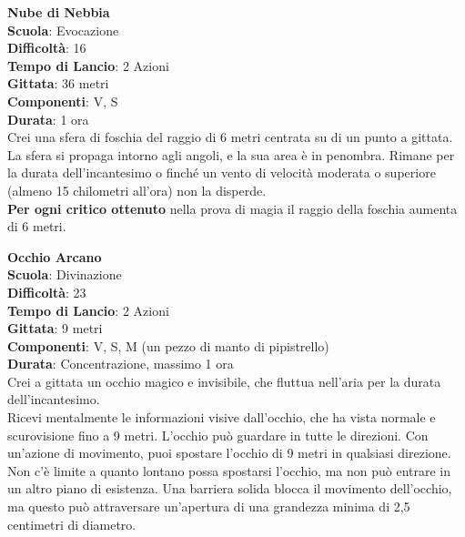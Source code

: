 \begin{multicols}{2}
\medskip\textbf{Nube di Nebbia}\\
\textbf{Scuola}: Evocazione\\
\textbf{Difficoltà}: 16\\
\textbf{Tempo di Lancio}: 2 Azioni\\
\textbf{Gittata}: 36 metri\\
\textbf{Componenti}: V, S\\
\textbf{Durata}: 1 ora\\
Crei una sfera di foschia del raggio di 6 metri centrata su di un punto a gittata. La sfera si propaga intorno agli angoli, e la sua area è in penombra. Rimane per la durata dell'incantesimo o finché un vento di velocità moderata o superiore (almeno 15 chilometri all'ora) non la disperde.\\
\textbf{Per ogni critico ottenuto} nella prova di magia il raggio della foschia aumenta di 6 metri.

\medskip\textbf{Occhio Arcano}\\
\textbf{Scuola}: Divinazione\\
\textbf{Difficoltà}: 23\\
\textbf{Tempo di Lancio}: 2 Azioni\\
\textbf{Gittata}: 9 metri\\
\textbf{Componenti}: V, S, M (un pezzo di manto di pipistrello)\\
\textbf{Durata}: Concentrazione, massimo 1 ora\\
Crei a gittata un occhio magico e invisibile, che fluttua nell'aria per la durata dell'incantesimo.\\
Ricevi mentalmente le informazioni visive dall'occhio, che ha vista normale e scurovisione fino a 9 metri. L'occhio può guardare in tutte le direzioni. Con un'azione di movimento, puoi spostare l'occhio di 9 metri in qualsiasi direzione. Non c'è limite a quanto lontano possa spostarsi l'occhio, ma non può entrare in un altro piano di esistenza. Una barriera solida blocca il movimento dell'occhio, ma questo può attraversare un'apertura di una grandezza minima di 2,5 centimetri di diametro.


\end{multicols}
